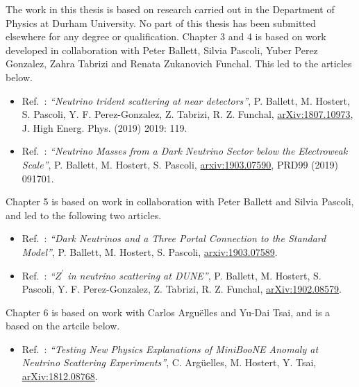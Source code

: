 \documentclass[openany,twoside,frontopenright,chaprunninghead]{ip3thesis}
\begin{document}
\begin{declaration*}
%
	The work in this thesis is based on research carried out in the Department of
	Physics at Durham University. No part of this thesis has been
	submitted elsewhere for any degree or qualification. Chapter 3 and 4 is based on work developed in collaboration with Peter Ballett, Silvia Pascoli, Yuber Perez Gonzalez, Zahra Tabrizi and Renata Zukanovich Funchal. This led to the articles below.
	\begin{itemize}
	 \item Ref.~\cite{Ballett:2018uuc}: \textit{``Neutrino trident scattering at near detectors''}, P. Ballett, M. Hostert, S. Pascoli, Y. F. Perez-Gonzalez, Z. Tabrizi, R. Z. Funchal, \href{https://arxiv.org/abs/1807.10973}{arXiv:1807.10973}, J. High Energ. Phys. (2019) 2019: 119.
	 \item Ref.~\cite{Ballett:2019cqp}: \textit{``Neutrino Masses from a Dark Neutrino Sector below the Electroweak Scale''}, P. Ballett, M. Hostert, S. Pascoli, \href{https://arxiv.org/abs/1903.07590}{arxiv:1903.07590}, PRD99 (2019) 091701.
	\end{itemize}
	Chapter 5 is based on work in collaboration with Peter Ballett and Silvia Pascoli, and led to the following two articles.
	\begin{itemize}
	\item Ref.~\cite{Ballett:2019pyw}: \textit{``Dark Neutrinos and a Three Portal Connection to the Standard Model''}, P. Ballett, M. Hostert, S. Pascoli, \href{https://arxiv.org/abs/1903.07589}{arxiv:1903.07589}.
	\item Ref.~\cite{Ballett:2019xoj}: \textit{``$Z^\prime$ in neutrino scattering at DUNE''}, P. Ballett, M. Hostert, S. Pascoli, Y. F. Perez-Gonzalez, Z. Tabrizi, R. Z. Funchal, \href{https://arxiv.org/abs/1902.08579}{arXiv:1902.08579}.
 	\end{itemize}
	Chapter 6 is based on work with Carlos Argu\"elles and Yu-Dai Tsai, and is a based on the artcile below.
	\begin{itemize}
	\item Ref.~\cite{Arguelles:2018mtc}: \textit{``Testing New Physics Explanations of MiniBooNE Anomaly at Neutrino Scattering Experiments''}, C. Arg\"uelles, M. Hostert, Y. Tsai, \href{https://arxiv.org/abs/1812.08768}{arXiv:1812.08768}.
	\end{itemize}

\end{declaration*}
\end{document}
